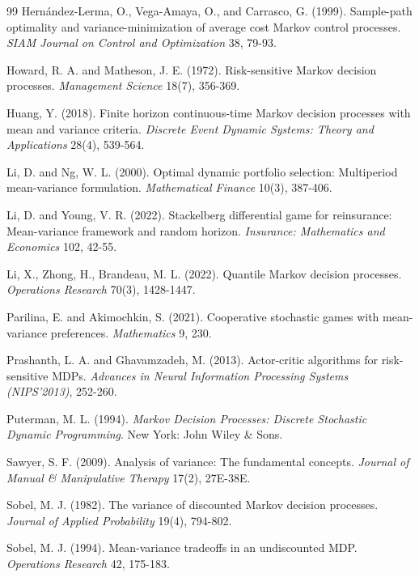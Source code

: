 \documentclass[12pt]{article}
\begin{document}
\begin{thebibliography}{99}
 Hern\'{a}ndez-Lerma, O., Vega-Amaya, O., and Carrasco, G. (1999). Sample-path optimality and variance-minimization of average cost Markov control processes. \emph{SIAM Journal on Control and Optimization} 38, 79-93.

 Howard, R. A. and Matheson, J. E. (1972). Risk-sensitive Markov decision processes. \emph{Management Science} 18(7), 356-369.

 Huang, Y. (2018). Finite horizon continuous-time Markov decision processes with mean and variance criteria. \emph{Discrete Event Dynamic Systems: Theory and Applications} 28(4), 539-564.

 Li, D. and Ng, W. L. (2000). Optimal dynamic portfolio selection: Multiperiod mean-variance formulation. \emph{Mathematical Finance} 10(3), 387-406.

 Li, D. and Young, V. R. (2022). Stackelberg differential game for reinsurance: Mean-variance framework and random horizon. \emph{Insurance: Mathematics and Economics} 102, 42-55.

 Li, X., Zhong, H., Brandeau, M. L. (2022). Quantile Markov decision processes. \emph{Operations Research} 70(3), 1428-1447.

 Parilina, E. and Akimochkin, S. (2021). Cooperative stochastic games with mean-variance preferences. \emph{Mathematics} 9, 230.

 Prashanth, L. A. and Ghavamzadeh, M. (2013). Actor-critic algorithms for risk-sensitive MDPs. \emph{Advances in Neural Information Processing Systems (NIPS'2013)}, 252-260.

 Puterman, M. L. (1994). \emph{Markov Decision Processes: Discrete Stochastic Dynamic Programming}. New York: John Wiley \& Sons.

 Sawyer, S. F. (2009). Analysis of variance: The fundamental concepts. \emph{Journal of Manual \& Manipulative Therapy} 17(2), 27E-38E.

 Sobel, M. J. (1982). The variance of discounted Markov decision processes. \emph{Journal of Applied Probability} 19(4), 794-802.

 Sobel, M. J. (1994). Mean-variance tradeoffs in an undiscounted MDP. \emph{Operations Research} 42, 175-183.


\end{thebibliography}
\end{document}
